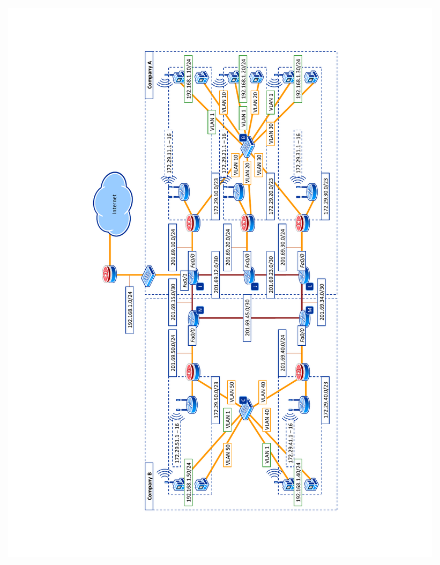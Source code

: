 \begin{figure}
\centering
\ifpdf
\includegraphics[width=0.9\linewidth]{Figures/Final.pdf}
\else

\end{figure}
